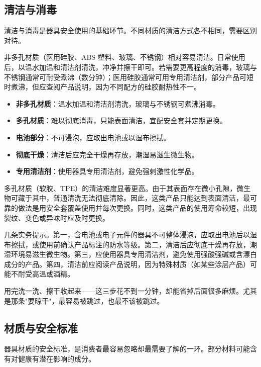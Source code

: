 \documentclass[12pt,UTF8]{ctexbook}
\newcommand{\keyword}[1]{\textbf{#1}}
\begin{document}
\subsection{清洁与消毒}

清洁与消毒是器具安全使用的基础环节。不同材质的清洁方式各不相同，需要区别对待。

非多孔材质（医用硅胶、ABS 塑料、玻璃、不锈钢）相对容易清洁。日常使用后，以温水加温和清洁剂清洗，冲净并擦干即可。若需要更高程度的消毒，玻璃与不锈钢通常可耐受煮沸（数分钟）；医用硅胶通常可用专用清洁剂，部分产品可短时煮沸，但应查阅产品说明，因为不同配方的硅胶耐热性不一。

\begin{itemize}
	\item \keyword{非多孔材质}：温水加温和清洁剂清洗，玻璃与不锈钢可煮沸消毒。
	\item \keyword{多孔材质}：难以彻底消毒，只能表面清洁，宜配安全套并定期更换。
	\item \keyword{电池部分}：不可浸泡，应取出电池或以湿布擦拭。
	\item \keyword{彻底干燥}：清洁后应完全干燥再存放，潮湿易滋生微生物。
	\item \keyword{专用清洁剂}：使用器具专用清洁剂，避免强刺激性化学品。
\end{itemize}

多孔材质（软胶、TPE）的清洁难度显著更高。由于其表面存在微小孔隙，微生物可藏于其中，普通清洗无法彻底清除。因此，这类产品只能达到表面清洁，最可靠的做法是用安全套覆盖使用并每次更换。同时，这类产品的使用寿命较短，出现裂纹、变色或异味时应及时更换。

几条实务提示。第一，含电池或电子元件的器具不可整体浸泡，应取出电池后以湿布擦拭，或使用前确认产品标注的防水等级。第二，清洁后应彻底干燥再存放，潮湿环境易滋生微生物。第三，应使用器具专用清洁剂，避免使用强酸强碱或含漂白成分的产品。第四，清洁前应阅读产品说明，因为特殊材质（如某些涂层产品）可能不耐受高温或酒精。

\begin{tcolorbox}[colback=pink!5!white,colframe=red!50!black,title=贴心小叮咛]
	用完洗一洗、擦干收起来——这三步花不到一分钟，却能省掉后面很多麻烦。尤其是那条"要晾干"，最容易被跳过，也最不该被跳过。
\end{tcolorbox}
\subsection{材质与安全标准}

器具材质的安全标准，是消费者最容易忽略却最需要了解的一环。部分材料可能含有对健康有潜在影响的成分。
\end{document}
